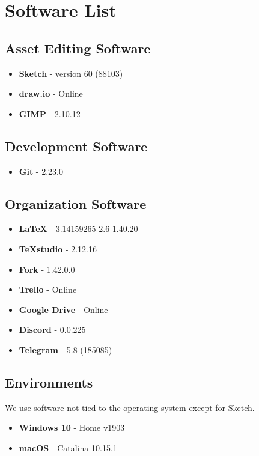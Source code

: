 \section{Software List}

\subsection{Asset Editing Software}

\begin{itemize}
	\item \textbf{Sketch} - version 60 (88103)
	\item \textbf{draw.io} - Online
	\item \textbf{GIMP} - 2.10.12
\end{itemize}


\subsection{Development Software}

\begin{itemize}
	\item \textbf{Git} - 2.23.0
\end{itemize}

\subsection{Organization Software}

\begin{itemize}
	\item \textbf{LaTeX} - 3.14159265-2.6-1.40.20
	\item \textbf{TeXstudio} - 2.12.16
	\item \textbf{Fork} - 1.42.0.0
	\item \textbf{Trello} - Online
	\item \textbf{Google Drive} - Online
	\item \textbf{Discord} - 0.0.225
	\item \textbf{Telegram} - 5.8 (185085)
\end{itemize}

\subsection{Environments}
We use software not tied to the operating system except for Sketch.

\begin{itemize}
	\item \textbf{Windows 10} - Home v1903
	\item \textbf{macOS} - Catalina 10.15.1
\end{itemize}
